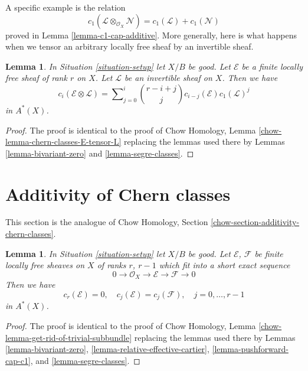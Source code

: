 \documentclass{stacks-project}
\theoremstyle{plain}
\newtheorem{lemma}[subsection]{Lemma}
\theoremstyle{definition}
\theoremstyle{remark}
\numberwithin{equation}{subsection}
\begin{document}
\medskip\noindent
A specific example is the relation
$$
c_1(\mathcal{L} \otimes_{\mathcal{O}_X} \mathcal{N})
=
c_1(\mathcal{L}) + c_1(\mathcal{N})
$$
proved in Lemma \ref{lemma-c1-cap-additive}.
More generally, here is what happens when we tensor an
arbitrary locally free sheaf by an invertible sheaf.

\begin{lemma}
\label{lemma-chern-classes-E-tensor-L}
In Situation \ref{situation-setup} let $X/B$ be good.
Let $\mathcal{E}$ be a finite locally free sheaf of
rank $r$ on $X$. Let $\mathcal{L}$ be an invertible
sheaf on $X$. Then we have
\begin{equation}
\label{equation-twist}
c_i({\mathcal E} \otimes {\mathcal L})
=
\sum\nolimits_{j = 0}^i
\binom{r - i + j}{j} c_{i - j}({\mathcal E}) c_1({\mathcal L})^j
\end{equation}
in $A^*(X)$.
\end{lemma}

\begin{proof}
The proof is identical to the proof of
Chow Homology, Lemma \ref{chow-lemma-chern-classes-E-tensor-L}
replacing the lemmas used there by Lemmas \ref{lemma-bivariant-zero} and
\ref{lemma-segre-classes}.
\end{proof}












\section{Additivity of Chern classes}
\label{section-additivity-chern-classes}

\noindent
This section is the analogue of Chow Homology, Section
\ref{chow-section-additivity-chern-classes}.

\begin{lemma}
\label{lemma-get-rid-of-trivial-subbundle}
In Situation \ref{situation-setup} let $X/B$ be good.
Let $\mathcal{E}$, $\mathcal{F}$ be finite locally free sheaves
on $X$ of ranks $r$, $r - 1$ which fit into a short
exact sequence
$$
0 \to \mathcal{O}_X \to \mathcal{E} \to \mathcal{F} \to 0
$$
Then we have
$$
c_r(\mathcal{E}) = 0, \quad
c_j(\mathcal{E}) = c_j(\mathcal{F}), \quad j = 0, \ldots, r - 1
$$
in $A^*(X)$.
\end{lemma}

\begin{proof}
The proof is identical to the proof of
Chow Homology, Lemma \ref{chow-lemma-get-rid-of-trivial-subbundle}
replacing the lemmas used there by
Lemmas \ref{lemma-bivariant-zero},
\ref{lemma-relative-effective-cartier},
\ref{lemma-pushforward-cap-c1}, and
\ref{lemma-segre-classes}.
\end{proof}
\end{document}
